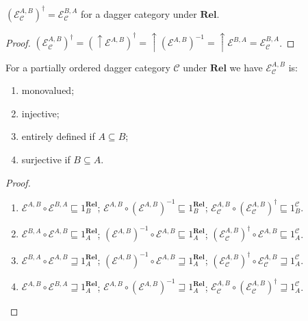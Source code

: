 \begin{prop}
  $(\mathcal{E}_{\mathcal{C}}^{A,B})^{\dagger} = \mathcal{E}_{\mathcal{C}}^{B,A}$ for a dagger category under
  $\mathbf{Rel}$.
\end{prop}

\begin{proof}
  $(\mathcal{E}_{\mathcal{C}}^{A,B})^{\dagger} = (\uparrow \mathcal{E}^{A,B})^{\dagger} = \uparrow (\mathcal{E}^{A,B})^{- 1} =
  \uparrow \mathcal{E}^{B,A} = \mathcal{E}_{\mathcal{C}}^{B,A}$.
\end{proof}

\begin{prop}
  For a partially ordered dagger category $\mathcal{C}$ under
  $\mathbf{Rel}$ we have $\mathcal{E}_{\mathcal{C}}^{A,B}$ is:
  \begin{enumerate}
    \item monovalued;
    
    \item injective;
    
    \item entirely defined if $A \subseteq B$;
    
    \item surjective if $B \subseteq A$.
  \end{enumerate}
\end{prop}

\begin{proof}
  ~
  \begin{enumerate}
    \item $\mathcal{E}^{A,B} \circ \mathcal{E}^{B,A} \sqsubseteq
    1^{\mathbf{Rel}}_B$; $\mathcal{E}^{A,B} \circ (\mathcal{E}^{A,B})^{- 1} \sqsubseteq 1^{\mathbf{Rel}}_B$;
    $\mathcal{E}_{\mathcal{C}}^{A,B} \circ (\mathcal{E}_{\mathcal{C}}^{A,B})^{\dagger} \sqsubseteq 1^{\mathcal{C}}_B$.
    
    \item $\mathcal{E}^{B,A} \circ \mathcal{E}^{A,B} \sqsubseteq
    1^{\mathbf{Rel}}_A$; $(\mathcal{E}^{A,B})^{- 1} \circ \mathcal{E}^{A,B} \sqsubseteq 1^{\mathbf{Rel}}_A$;
    $(\mathcal{E}_{\mathcal{C}}^{A,B})^{\dagger} \circ \mathcal{E}^{A,B} \sqsubseteq 1^{\mathcal{C}}_A$.
    
    \item $\mathcal{E}^{B,A} \circ \mathcal{E}^{A,B} \sqsupseteq
    1^{\mathbf{Rel}}_A$; $(\mathcal{E}^{A,B})^{- 1} \circ \mathcal{E}^{A,B} \sqsupseteq 1^{\mathbf{Rel}}_A$;
    $(\mathcal{E}_{\mathcal{C}}^{A,B})^{\dagger} \circ \mathcal{E}_{\mathcal{C}}^{A,B} \sqsupseteq 1^{\mathcal{C}}_A$.
    
    \item $\mathcal{E}^{A,B} \circ \mathcal{E}^{B,A} \sqsupseteq
    1^{\mathbf{Rel}}_A$; $\mathcal{E}^{A,B} \circ (\mathcal{E}^{A,B})^{- 1} \sqsupseteq 1^{\mathbf{Rel}}_A$;
    $\mathcal{E}_{\mathcal{C}}^{A,B} \circ (\mathcal{E}_{\mathcal{C}}^{A,B})^{\dagger} \sqsupseteq 1^{\mathcal{C}}_A$.
  \end{enumerate}
\end{proof}

